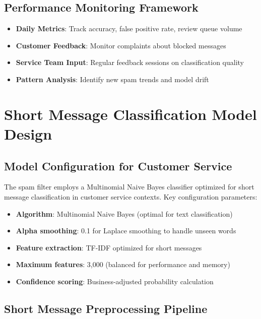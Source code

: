 \documentclass[12pt,a4paper]{article}
\begin{document}
\subsection{Performance Monitoring Framework}

\begin{itemize}
    \item \textbf{Daily Metrics}: Track accuracy, false positive rate, review queue volume
    \item \textbf{Customer Feedback}: Monitor complaints about blocked messages
    \item \textbf{Service Team Input}: Regular feedback sessions on classification quality
    \item \textbf{Pattern Analysis}: Identify new spam trends and model drift
\end{itemize}

\section{Short Message Classification Model Design}

\subsection{Model Configuration for Customer Service}

The spam filter employs a Multinomial Naive Bayes classifier optimized for short message classification in customer service contexts. Key configuration parameters:

\begin{itemize}
    \item \textbf{Algorithm}: Multinomial Naive Bayes (optimal for text classification)
    \item \textbf{Alpha smoothing}: 0.1 for Laplace smoothing to handle unseen words
    \item \textbf{Feature extraction}: TF-IDF optimized for short messages
    \item \textbf{Maximum features}: 3,000 (balanced for performance and memory)
    \item \textbf{Confidence scoring}: Business-adjusted probability calculation
\end{itemize}

\subsection{Short Message Preprocessing Pipeline}
\end{document}
